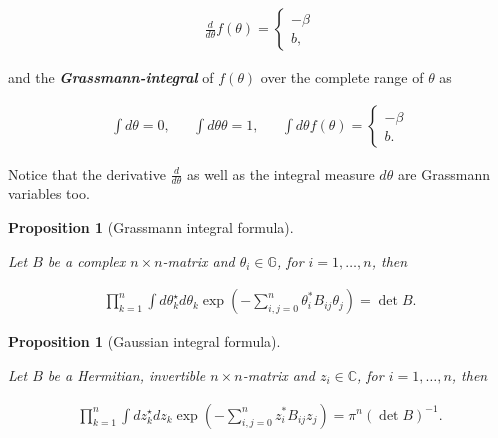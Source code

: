 \documentclass{article}
\theoremstyle{plain} %
\newtheorem{prop}[theorem]{Proposition}
\theoremstyle{convention} %
\theoremstyle{remark} %
\def\df#1{\textbf{\textit{#1}}}
\numberwithin{equation}{section}
\begin{document}
\begin{appendix}
\begin{align*}
  \frac{d}{d \theta} f(\theta) = \left\{
      \begin{array}{ll}
          -\beta \\
          b,
      \end{array}
  \right.
\end{align*}

and the \df{Grassmann-integral} of $f(\theta)$ over the complete range of $\theta$ as

\begin{align*}
  \int d \theta = 0, &&\int d \theta \theta = 1, &&\int d \theta f(\theta) = \left\{
      \begin{array}{ll}
          -\beta \\
          b.
      \end{array}
  \right.
\end{align*}

Notice that the derivative $\frac{d}{d \theta}$ as well as the integral measure $d \theta$ are Grassmann variables too.

\begin{prop}[Grassmann integral formula]

\label{prop:grassmann_integral}

Let $B$ be a complex $n \times n$-matrix and $\theta_i \in \mathbb{G}$, for $i = 1, \dots, n$, then

\begin{align*}
  \prod_{k=1}^n \int d \theta_k^{\star} d \theta_k \exp( - \sum_{i,j=0}^n \theta_i^{*} B_{ij} \theta_j ) = \det B.
\end{align*}

\end{prop}

\begin{prop}[Gaussian integral formula]

\label{prop:gauss_integral}

Let $B$ be a Hermitian, invertible $n \times n$-matrix and $z_i \in \mathbb{C}$, for $i = 1, \dots, n$, then

\begin{align*}
  \prod_{k=1}^n \int d z_k^{\star} d z_k \exp( - \sum_{i,j=0}^n z_i^{*} B_{ij} z_j ) = \pi^n (\det B)^{-1}.
\end{align*}


\end{prop}
\end{appendix}
\end{document}
